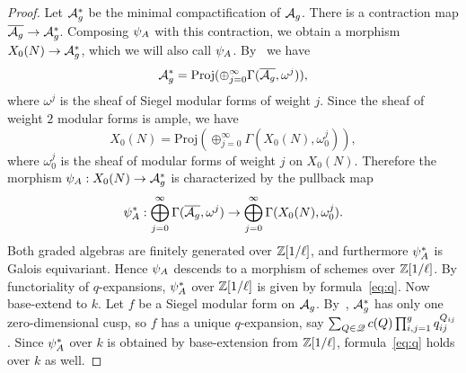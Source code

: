 \documentclass{amsart}
\begin{document}
\begin{proof}
    Let ${\mathcal{A}_{g}^\ast}$ be the minimal compactification of $\mathcal{A}_g$. There is a contraction map $\overline{\mathcal{A}_g} \to {\mathcal{A}_{g}^\ast}$. Composing $\psi_{A}$ with this contraction, we obtain a morphism $X_0(N) \to {\mathcal{A}_{g}^\ast}$, which we will also call $\psi_{A}$. By~\cite[Theorem V.2.3]{faltings1990degeneration} we have 
    $${\mathcal{A}_{g}^\ast} = \textrm{Proj}(\oplus_{j=0}^\infty \Gamma(\overline{\mathcal{A}_g}, \omega^j)),$$ 
    where $\omega^j$ is the sheaf of Siegel modular forms of weight $j$. Since %
    the sheaf of weight $2$ modular forms is ample, we have 
    $$X_0(N) = \textrm{Proj}(\oplus_{j=0}^\infty \Gamma(X_0(N), \omega_0^j)),$$ 
    where $\omega_0^j$ is the sheaf of modular forms of weight $j$ on $X_0(N)$. Therefore the morphism $\psi_{A}: X_0(N) \to {\mathcal{A}_{g}^\ast}$ is characterized by the pullback map
    \[
      \psi_{A}^*: \bigoplus_{j=0}^\infty \Gamma(\overline{\mathcal{A}_g}, \omega^j) \to \bigoplus_{j=0}^\infty \Gamma(X_0(N), \omega_0^j).
    \]
    Both graded algebras are finitely generated over $\mathbb{Z}[1/\ell]$, and furthermore $\psi_{A}^\ast$ is Galois equivariant. Hence $\psi_{A}$ descends to a morphism of schemes over $\mathbb{Z}[1/\ell]$. By functoriality of $q$-expansions, $\psi_{A}^*$ over $\mathbb{Z}[1/\ell]$ is given by formula~\eqref{eq:q}. Now base-extend to $k$. Let $f$ be a Siegel modular form on $\mathcal{A}_g$. By~\cite[Theorem V.2.3]{faltings1990degeneration}, ${\mathcal{A}_{g}^\ast}$ has only one zero-dimensional cusp, so $f$ has a unique $q$-expansion, say $\sum_{Q \in \mathscr{Q}} c(Q) \prod_{i,j=1}^g q_{ij}^{Q_{ij}}$. Since $\psi_{A}^*$ over $k$ is obtained by base-extension from $\mathbb{Z}[1/\ell]$, formula~\eqref{eq:q} holds over $k$ as well.

\end{proof}
\end{document}
